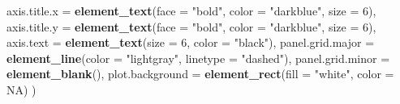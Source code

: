 \documentclass[
]{article}
\newenvironment{Shaded}{\begin{snugshade}}{\end{snugshade}}
\newcommand{\AttributeTok}[1]{\textcolor[rgb]{0.13,0.29,0.53}{#1}}
\newcommand{\ConstantTok}[1]{\textcolor[rgb]{0.56,0.35,0.01}{#1}}
\newcommand{\DecValTok}[1]{\textcolor[rgb]{0.00,0.00,0.81}{#1}}
\newcommand{\FunctionTok}[1]{\textcolor[rgb]{0.13,0.29,0.53}{\textbf{#1}}}
\newcommand{\NormalTok}[1]{#1}
\newcommand{\StringTok}[1]{\textcolor[rgb]{0.31,0.60,0.02}{#1}}
\begin{document}
\begin{Shaded}
\begin{Highlighting}[]
    \AttributeTok{axis.title.x =} \FunctionTok{element\_text}\NormalTok{(}\AttributeTok{face =} \StringTok{"bold"}\NormalTok{, }\AttributeTok{color =} \StringTok{"darkblue"}\NormalTok{, }\AttributeTok{size =} \DecValTok{6}\NormalTok{),}
    \AttributeTok{axis.title.y =} \FunctionTok{element\_text}\NormalTok{(}\AttributeTok{face =} \StringTok{"bold"}\NormalTok{, }\AttributeTok{color =} \StringTok{"darkblue"}\NormalTok{, }\AttributeTok{size =} \DecValTok{6}\NormalTok{),}
    \AttributeTok{axis.text =} \FunctionTok{element\_text}\NormalTok{(}\AttributeTok{size =} \DecValTok{6}\NormalTok{, }\AttributeTok{color =} \StringTok{"black"}\NormalTok{),}
    \AttributeTok{panel.grid.major =} \FunctionTok{element\_line}\NormalTok{(}\AttributeTok{color =} \StringTok{"lightgray"}\NormalTok{, }\AttributeTok{linetype =} \StringTok{"dashed"}\NormalTok{),}
    \AttributeTok{panel.grid.minor =} \FunctionTok{element\_blank}\NormalTok{(),}
    \AttributeTok{plot.background =} \FunctionTok{element\_rect}\NormalTok{(}\AttributeTok{fill =} \StringTok{"white"}\NormalTok{, }\AttributeTok{color =} \ConstantTok{NA}\NormalTok{)}
\NormalTok{  )}


\end{Highlighting}
\end{Shaded}
\end{document}
